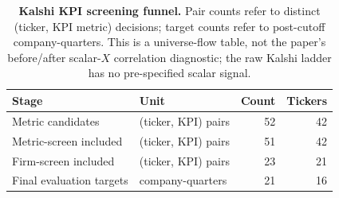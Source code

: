 \begin{table}[t]
\centering
\caption{\textbf{Kalshi KPI screening funnel.}
Pair counts refer to distinct (ticker, KPI metric) decisions; target counts refer to
post-cutoff company-quarters. This is a universe-flow table, not the paper's before/after
scalar-$X$ correlation diagnostic; the raw Kalshi ladder has no pre-specified scalar signal.}
\label{tab:kalshi_screening}
\begin{tabular}{llrr}
\toprule
Stage & Unit & Count & Tickers \\
\midrule
Metric candidates & (ticker, KPI) pairs & 52 & 42 \\
Metric-screen included & (ticker, KPI) pairs & 51 & 42 \\
Firm-screen included & (ticker, KPI) pairs & 23 & 21 \\
Final evaluation targets & company-quarters & 21 & 16 \\
\bottomrule
\end{tabular}
\end{table}
